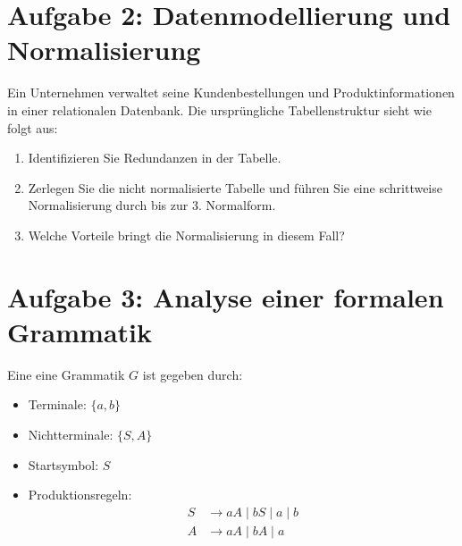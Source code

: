 \documentclass[a4paper,12pt]{article}
\begin{document}
	
\section*{Aufgabe 2: Datenmodellierung und Normalisierung}

Ein Unternehmen verwaltet seine Kundenbestellungen und Produktinformationen in einer relationalen Datenbank. Die ursprüngliche Tabellenstruktur sieht wie folgt aus:

\begin{table}[h]
	\centering
	\caption{Ursprüngliche nicht normalisierte Tabelle}
\end{table}

	\begin{enumerate}
	\item Identifizieren Sie Redundanzen in der Tabelle.
	\item Zerlegen Sie die nicht normalisierte Tabelle und führen Sie eine schrittweise Normalisierung durch bis zur 3. Normalform.
	\item Welche Vorteile bringt die Normalisierung in diesem Fall?
\end{enumerate}

	\section*{Aufgabe 3: Analyse einer formalen Grammatik}
	
	Eine eine Grammatik \( G \) ist gegeben durch:
	\begin{itemize}
		\item Terminale: \( \{a, b\} \)
		\item Nichtterminale: \( \{S, A\} \)
		\item Startsymbol: \( S \)
		\item Produktionsregeln:
		\begin{align*}
			S &\to aA \mid bS \mid a \mid b \\
			A &\to aA \mid bA \mid a 
		\end{align*}
	\end{itemize}
	
\end{document}
